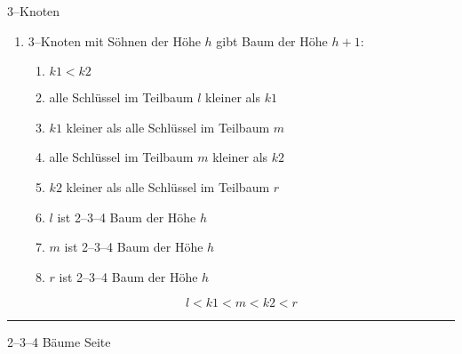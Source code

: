 
\begin{slide}{}
\normalsize

\begin{center}
3--Knoten 
\end{center}
\vspace*{0.5cm}

\footnotesize
\begin{enumerate}
\item 3--Knoten mit S\"ohnen der H\"ohe $h$ gibt Baum der H\"ohe $h+1$:

\hspace*{3cm} 
\begin{enumerate}
\item $k1 < k2$
\item alle Schl\"ussel im Teilbaum $l$ kleiner als $k1$
\item $k1$ kleiner als alle Schl\"ussel im Teilbaum $m$ 
\item alle Schl\"ussel im Teilbaum $m$ kleiner als $k2$
\item $k2$ kleiner als alle Schl\"ussel im Teilbaum $r$  
\item $l$ ist 2--3--4 Baum der H\"ohe $h$
\item $m$ ist 2--3--4 Baum der H\"ohe $h$
\item $r$ ist 2--3--4 Baum der H\"ohe $h$
\end{enumerate}

$$ l < k1 < m < k2 < r  $$
\end{enumerate}


\vspace*{\fill}
\tiny \addtocounter{mypage}{1}
\rule{17cm}{1mm}
2--3--4 B\"aume  \hspace*{\fill} Seite 
\end{slide}


